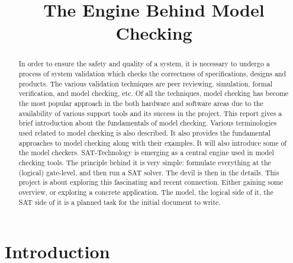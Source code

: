 \documentclass{article}
\begin{document}
\title{ The Engine Behind Model Checking}
\maketitle

\begin{abstract}
In order to ensure the safety and quality of a system, it is necessary to undergo a process of system validation which checks the correctness of specifications, designs and products. The various validation techniques are peer reviewing, simulation, formal verification, and model checking, etc. Of all the techniques, model checking has become the most popular approach in the both hardware and software areas due to the availability of various support tools and its success in the project. This report gives a brief introduction about the fundamentals of model checking. Various terminologies used related to model checking is also described. It also provides the fundamental approaches to model checking along with their examples. It will also introduce some of the model checkers. SAT-Technology is emerging as a central engine used in model checking tools. The principle behind it is very simple: formulate everything at the (logical) gate-level, and then run a SAT solver. The devil is then in the details. This project is about exploring this fascinating and recent connection. Either gaining some overview, or exploring a concrete application. The model, the logical side of it, the SAT side of it is a planned task for the initial document to write.
\end{abstract}

\newpage
\tableofcontents
\newpage

\section{Introduction}
\label{sec:intro}
\end{document}
